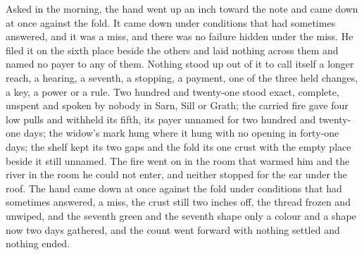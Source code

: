 \scenebreak

Asked in the morning, the hand went up an inch toward the note and came down at once against the fold. It came down under conditions that had sometimes answered, and it was a miss, and there was no failure hidden under the miss. He filed it on the sixth place beside the others and laid nothing across them and named no payer to any of them. Nothing stood up out of it to call itself a longer reach, a hearing, a seventh, a stopping, a payment, one of the three held changes, a key, a power or a rule. Two hundred and twenty-one stood exact, complete, unspent and spoken by nobody in Sarn, Sill or Grath; the carried fire gave four low pulls and withheld its fifth, its payer unnamed for two hundred and twenty-one days; the widow's mark hung where it hung with no opening in forty-one days; the shelf kept its two gaps and the fold its one crust with the empty place beside it still unnamed. The fire went on in the room that warmed him and the river in the room he could not enter, and neither stopped for the ear under the roof. The hand came down at once against the fold under conditions that had sometimes answered, a miss, the crust still two inches off, the thread frozen and unwiped, and the seventh green and the seventh shape only a colour and a shape now two days gathered, and the count went forward with nothing settled and nothing ended.
